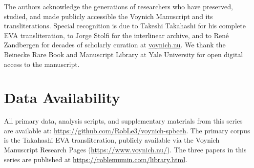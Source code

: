 \documentclass[11pt,a4paper,twocolumn]{article}
\begin{document}
The authors acknowledge the generations of researchers who have preserved, studied, and made publicly accessible the Voynich Manuscript and its transliterations. Special recognition is due to Takeshi Takahashi for his complete EVA transliteration, to Jorge Stolfi for the interlinear archive, and to Ren\'e Zandbergen for decades of scholarly curation at \url{voynich.nu}. We thank the Beinecke Rare Book and Manuscript Library at Yale University for open digital access to the manuscript.

\section*{Data Availability}

All primary data, analysis scripts, and supplementary materials from this series are available at:
\url{https://github.com/RobLe3/voynich-spbceh}. The primary corpus is the Takahashi EVA transliteration, publicly available via the Voynich Manuscript Research Pages (\url{https://www.voynich.nu/}). The three papers in this series are published at \url{https://roblemumin.com/library.html}.
\end{document}
